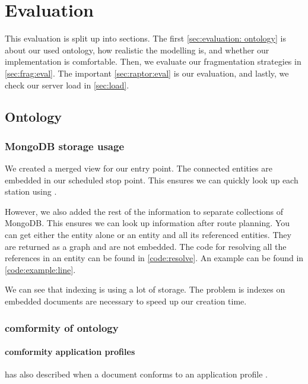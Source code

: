 \chapter{Evaluation}
This evaluation is split up into  sections. The first \autoref{sec:evaluation: ontology} is about our used ontology, how realistic the modelling is, and whether our implementation is comfortable.   Then, we evaluate our fragmentation strategies in \autoref{sec:frag:eval}. The important \autoref{sec:raptor:eval} is our  evaluation, and lastly, we check our server load in \autoref{sec:load}. 

\section{Ontology}
\label{sec:evaluation: ontology}
\subsection{MongoDB storage usage}
We created a merged view for our entry point. The connected entities are embedded in our scheduled stop point. This ensures we can quickly look up each station using .

However, we also added the rest of the information to separate collections of MongoDB. This ensures we can look up information after route planning. You can get either the entity alone or an entity and all its referenced entities. They are returned as a graph and are not embedded. The code for resolving all the references in an entity can be found in \autoref{code:resolve}. An example can be found in \autoref{code:example:line}.


We can see that indexing is using a lot of storage. The problem is indexes on embedded documents are necessary to speed up our creation time.
\subsection{comformity of ontology}
\subsubsection{comformity application profiles}
 has also described when a  document conforms to an application profile \cite{noauthor_conformiteit_nodate}.

